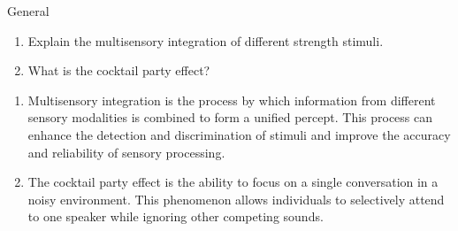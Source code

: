 \documentclass{article}
\begin{document}
\begin{exercise}{General}
  \begin{enumerate}
    \item Explain the multisensory integration of different strength stimuli.
    \item What is the cocktail party effect?
  \end{enumerate}

  \begin{solution}
    \begin{enumerate}
      \item Multisensory integration is the process by which information from different sensory modalities is combined to form a unified percept. This process can enhance the detection and discrimination of stimuli and improve the accuracy and reliability of sensory processing.
      \item The cocktail party effect is the ability to focus on a single conversation in a noisy environment. This phenomenon allows individuals to selectively attend to one speaker while ignoring other competing sounds.
    \end{enumerate}
  \end{solution}
\end{exercise}
\end{document}

